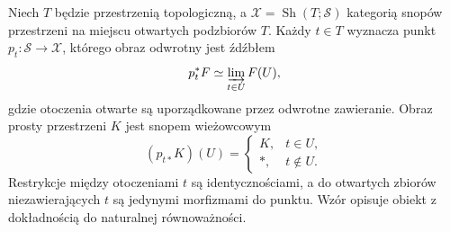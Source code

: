 \begin{stwierdzenie}\label{cat:prop:infty-topos-stalk}
Niech $T$ będzie przestrzenią topologiczną, a $\mathcal X=\operatorname{Sh}(T;\mathcal S)$ kategorią snopów przestrzeni na miejscu otwartych podzbiorów $T$. Każdy $t\in T$ wyznacza punkt $p_t:\mathcal S\to\mathcal X$, którego obraz odwrotny jest źdźbłem
\[
 p_t^*F\simeq \varinjlim_{t\in U}F(U),
\]
gdzie otoczenia otwarte są uporządkowane przez odwrotne zawieranie. Obraz prosty przestrzeni $K$ jest snopem wieżowcowym
\[
 (p_{t*}K)(U)=
 \begin{cases}
 K,&t\in U,\\
 *,&t\notin U.
 \end{cases}
\]
Restrykcje między otoczeniami $t$ są identycznościami, a do otwartych zbiorów niezawierających $t$ są jedynymi morfizmami do punktu. Wzór opisuje obiekt z dokładnością do naturalnej równoważności.
\end{stwierdzenie}
